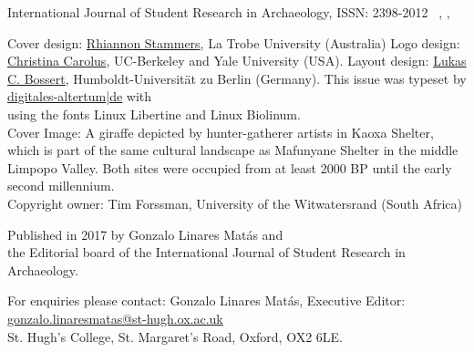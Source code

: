 
\IJSRAtitlepage
\clearpage
\mypagesize
\thispagestyle{empty}
\hfill
\vfill

\begin{footnotesize}
\noindent International Journal of Student Research in Archaeology,\newline
ISSN: 2398-2012\newline
\IJSRAmonth\ \IJSRAyear , \IJSRAvolume , \IJSRAnumber\\
\vspace{2em}


\noindent Cover design: \href{https://latrobe.academia.edu/RhiannonStammers}{Rhiannon Stammers}, La Trobe University (Australia)\newline
\noindent Logo design: \href{https://hraf.yale.edu/about/staff/christina-carolus/}{Christina Carolus}, UC-Berkeley and Yale University (USA).\newline
\noindent Layout design: \href{https://hu-berlinhttps://dainst.academia.edu/LukasCBossert}{Lukas C. Bossert}, Humboldt-Universität zu Berlin (Germany). \newline \indent This issue was typeset by \href{www.digitales-altertum.de}{digitales-altertum|de}  with  \\ \indent using the fonts Linux Libertine and {\sffamily Linux Biolinum}.\\
Cover Image: 
A giraffe depicted by hunter-gatherer artists in Kaoxa Shelter, which is part of the same cultural landscape as Mafunyane Shelter in the middle Limpopo Valley. Both sites were occupied from at least 2000 BP until the early second millennium\AD.\\
Copyright owner: Tim Forssman, University of the Witwatersrand (South Africa)

\vspace{2em}

\noindent Published in 2017 by Gonzalo Linares Matás and \\ the Editorial board of the International Journal of Student Research in Archaeology. 




\vspace{2em}






\noindent For enquiries please contact: Gonzalo Linares Matás, Executive Editor:\\ \href{mailto:gonzalo.linaresmatas@st-hugh.ox.ac.uk}{gonzalo.linaresmatas@st-hugh.ox.ac.uk}\\  St. Hugh’s College, St. Margaret’s Road, Oxford, OX2 6LE.


\end{footnotesize}
